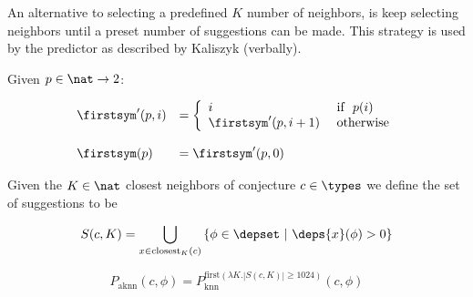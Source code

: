 An alternative to selecting a predefined $K$ number of neighbors, is keep selecting neighbors until a preset number of suggestions can be made.
This strategy is used by the \knnadaptive predictor as described by Kaliszyk (verbally).

\begin{definition}\label{def:first}
  Given $p \in \nat \rightarrow 2$:

  $$
    \begin{array}{ll}
      \firstsym'(p, i) & = \left\{
      \begin{array}{ll}
         i & ~\text{if}~~ p(i) \\
         \firstsym'(p, i+1) & ~\text{otherwise} \\
      \end{array}
      \right. \\
      \\
      \firstsym(p) & = \firstsym'(p, 0)
    \end{array}
  $$
\end{definition}

\begin{definition}
  Given the $K \in \nat$ closest neighbors of conjecture $c \in \types$ we define the set of suggestions to be

  $$
    S(c, K) = \bigcup_{x \in \text{closest}_K(c)} \left\{ \phi \in \depset ~|~ \deps{x}(\phi) > 0 \right\}
  $$
\end{definition}

\begin{definition}
  $$
    P_\text{aknn}(c, \phi) = P^{\text{first}(\lambda K . |S(c, K)| \geq 1024)}_\text{knn}(c, \phi)
  $$
\end{definition}
